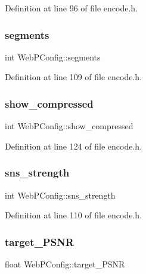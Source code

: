 Definition at line 96 of file encode.\+h.

\mbox{\label{struct_web_p_config_af7fa0f65c3e44e92fb26e928cb3e8e8a}} 
\subsubsection{\texorpdfstring{segments}{segments}}
{\footnotesize\ttfamily int Web\+P\+Config\+::segments}



Definition at line 109 of file encode.\+h.

\mbox{\label{struct_web_p_config_adcec1e569a003d4efd78952e145e4dfa}} 
\subsubsection{\texorpdfstring{show\_compressed}{show\_compressed}}
{\footnotesize\ttfamily int Web\+P\+Config\+::show\+\_\+compressed}



Definition at line 124 of file encode.\+h.

\mbox{\label{struct_web_p_config_afd11201753c84bdb5bf7412f1879dd83}} 
\subsubsection{\texorpdfstring{sns\_strength}{sns\_strength}}
{\footnotesize\ttfamily int Web\+P\+Config\+::sns\+\_\+strength}



Definition at line 110 of file encode.\+h.

\mbox{\label{struct_web_p_config_ab0f1a8383cb5b3cb6e6b4584fd5a7810}} 
\subsubsection{\texorpdfstring{target\_PSNR}{target\_PSNR}}
{\footnotesize\ttfamily float Web\+P\+Config\+::target\+\_\+\+P\+S\+NR}



